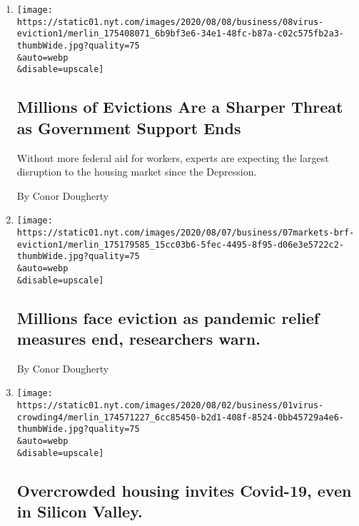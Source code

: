 \begin{enumerate}
\def\labelenumi{\arabic{enumi}.}
\item
  \href{/2020/08/07/business/economy/housing-economy-eviction-renters.html}{}

  \texttt{[image: https://static01.nyt.com/images/2020/08/08/business/08virus-eviction1/merlin\_175408071\_6b9bf3e6-34e1-48fc-b87a-c02c575fb2a3-thumbWide.jpg?quality=75\\\&auto=webp\\\&disable=upscale]}

  \hypertarget{millions-of-evictions-are-a-sharper-threat-as-government-support-ends}{%
  \subsection{Millions of Evictions Are a Sharper Threat as Government
  Support
  Ends}\label{millions-of-evictions-are-a-sharper-threat-as-government-support-ends}}

  Without more federal aid for workers, experts are expecting the
  largest disruption to the housing market since the Depression.

  By Conor Dougherty
\item
  \href{/2020/08/07/business/millions-face-eviction-as-pandemic-relief-measures-end-researchers-warn.html}{}

  \texttt{[image: https://static01.nyt.com/images/2020/08/07/business/07markets-brf-eviction1/merlin\_175179585\_15cc03b6-5fec-4495-8f95-d06e3e5722c2-thumbWide.jpg?quality=75\\\&auto=webp\\\&disable=upscale]}

  \hypertarget{millions-face-eviction-as-pandemic-relief-measures-end-researchers-warn}{%
  \subsection{Millions face eviction as pandemic relief measures end,
  researchers
  warn.}\label{millions-face-eviction-as-pandemic-relief-measures-end-researchers-warn}}

  By Conor Dougherty
\item
  \href{/live/2020/08/03/business/stock-market-today-coronavirus/overcrowded-housing-invites-covid-19-even-in-silicon-valley}{}

  \texttt{[image: https://static01.nyt.com/images/2020/08/02/business/01virus-crowding4/merlin\_174571227\_6cc85450-b2d1-408f-8524-0bb45729a4e6-thumbWide.jpg?quality=75\\\&auto=webp\\\&disable=upscale]}

  \hypertarget{overcrowded-housing-invites-covid-19-even-in-silicon-valley}{%
  \subsection{Overcrowded housing invites Covid-19, even in Silicon
  Valley.}\label{overcrowded-housing-invites-covid-19-even-in-silicon-valley}}


\end{enumerate}
